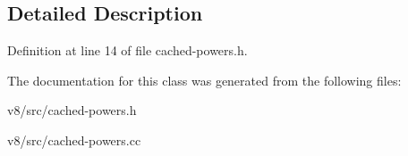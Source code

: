 \subsection{Detailed Description}


Definition at line 14 of file cached-\/powers.\+h.



The documentation for this class was generated from the following files\+:\begin{DoxyCompactItemize}
\item 
v8/src/cached-\/powers.\+h\item 
v8/src/cached-\/powers.\+cc\end{DoxyCompactItemize}

